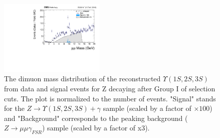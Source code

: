 \begin{figure}[!htbp]
\begin{center}
\includegraphics[width=0.45\textwidth]{figures_and_tables/outputPlots/ZtoUpsilon_Cat0_ZZZZZ/nEvts/data_x_mc/noKinCuts/h_noKin_Upsilon_Mass_Signal_and_Background_LargeRange}\hspace*{1.cm}
\end{center}\vspace*{-.5cm}
\caption{The dimuon mass distribution of the reconstructed $\Upsilon (1S,2S,3S)$ from data and signal events for Z decaying after Group I of selection cuts. The plot is normalized to the number of events. "Signal" stands for the $Z \rightarrow \Upsilon (1S,2S,3S) + \gamma$ sample (scaled by a factor of $\times 100$) and "Background" corresponds to the peaking background ($Z \rightarrow \mu\mu\gamma_{FSR}$) sample (scaled by a factor of x3).}
\label{fig:dimuon_mass_ZtoUpsilon_Cat0}
\end{figure}



